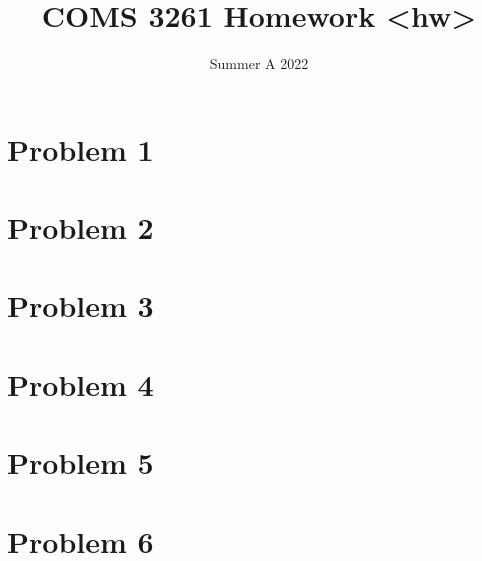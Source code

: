 \documentclass{../homework_template}
\title{COMS 3261 Homework <hw>}
\date{Summer A 2022}
\begin{document}
\maketitle
{}

\newpage
\section{Problem 1}


\newpage
\section{Problem 2}


\newpage
\section{Problem 3}


\newpage
\section{Problem 4}


\newpage
\section{Problem 5}


\newpage
\section{Problem 6}

\end{document}

